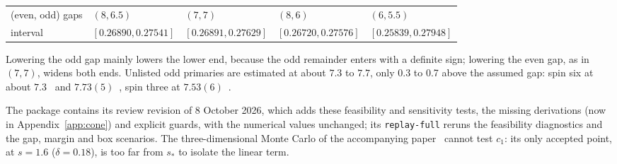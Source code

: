 \documentclass[11pt,a4paper]{article}
\numberwithin{equation}{section}
\begin{document}
\begin{itemize}
\begin{center}
\begin{tabular}{@{}lllll@{}}
\toprule
(even, odd) gaps & $(8,6.5)$ & $(7,7)$ & $(8,6)$ & $(6,5.5)$\\
interval & $[0.26890,0.27541]$ & $[0.26891,0.27629]$ & $[0.26720,0.27576]$ & $[0.25839,0.27948]$\\
\bottomrule
\end{tabular}
\end{center}
 Lowering the odd gap mainly lowers the lower end, because the odd remainder enters with a definite sign; lowering the
 even gap, as in $(7,7)$, widens both ends. Unlisted odd primaries are estimated at about $7.3$ to $7.7$, only
 0.3 to 0.7 above the assumed gap: spin six at about $7.3$~\cite{Henriksson:2022} and $7.73(5)$~\cite{Fardelli:2026},
 spin three at $7.53(6)$~\cite{Fardelli:2026}.
\end{itemize}
The package contains its review revision of 8 October 2026, which adds these feasibility and sensitivity tests, the
missing derivations (now in Appendix~\ref{app:cone}) and explicit guards, with the numerical values unchanged; its
\texttt{replay-full} reruns the feasibility diagnostics and the gap, margin and box scenarios. The three-dimensional
Monte Carlo of the accompanying paper~\cite{Paper} cannot test $c_1$: its only accepted point, at $s=1.6$
($\delta=0.18$), is too far from $s_*$ to isolate the linear term.

\end{document}
